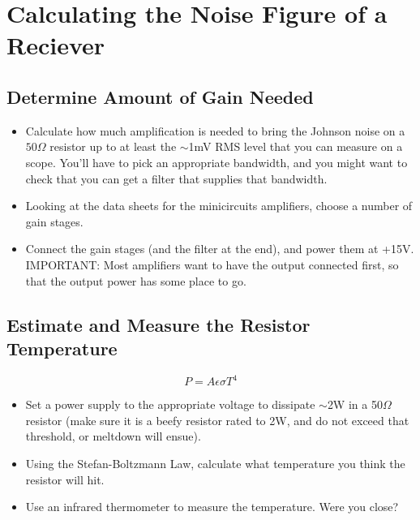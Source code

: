 \documentclass[11pt]{article}
\begin{document}
\section{Calculating the Noise Figure of a Reciever}

\subsection*{Determine Amount of Gain Needed}
\begin{itemize}
\item Calculate how much amplification is needed to bring the Johnson noise on a $50\Omega$ resistor
up to at least the $\sim$1mV RMS level that you can measure on a scope.  You'll have to pick an appropriate
bandwidth, and you might want to check that you can get a filter that supplies that bandwidth. 
\item Looking at the data sheets for the minicircuits amplifiers, choose a number of gain stages.
\item Connect the gain stages (and the filter at the end), and power them at +15V.  IMPORTANT: Most amplifiers
want to have the output connected first, so that the output power has some place to go.
\end{itemize}


\subsection*{Estimate and Measure the Resistor Temperature}
\begin{equation}
P=A\epsilon \sigma T^4
\end{equation}
\begin{itemize}
\item Set a power supply to the appropriate voltage to dissipate $\sim$2W in a 50$\Omega$ resistor (make
sure it is a beefy resistor rated to 2W, and do not exceed that threshold, or meltdown will ensue).
\item Using the Stefan-Boltzmann Law, calculate what temperature you think the resistor will hit.
\item Use an infrared thermometer to measure the temperature.  Were you close?
\end{itemize}
\end{document}

